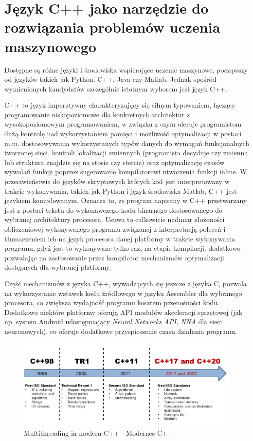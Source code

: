\section{Język C++ jako narzędzie do rozwiązania problemów uczenia maszynowego}

Dostępne są różne języki i środowiska wspierające uczenie maszynowe, począwszy od języków takich jak Python, C++, Java czy Matlab. Jednak spośród wymienionych kandydatów szczególnie istotnym wyborem jest język C++. 

C++ to język imperatywny charakteryzujący się silnym typowaniem, łączący programowanie niskopoziomowe dla konkretnych architektur z wysokopoziomowym programowaniem, w związku z czym oferuje programistom dużą kontrolę nad wykorzystaniem pamięci i możliwość optymalizacji w postaci m.in. dostosowywania wykorzystanych typów danych do wymagań funkcjonalnych tworzonej sieci, kontroli lokalizacji zmiennych (programista decyduje czy zmienna lub struktura znajdzie się na stosie czy stercie) oraz optymalizację czasów wywołań funkcji poprzez sugerowanie kompilatorowi utworzenia funkcji inline. W przeciwieństwie do języków skryptowych których kod jest interpretowany w trakcie wykonywania, takich jak Python i język środowiska Matlab, C++ jest językiem kompilowanym. Oznacza to, że program napisany w C++ przetwarzany jest z postaci tekstu do wykonawczego kodu binarnego dostosowanego do wybranej architektury procesora. Usuwa to całkowicie nadmiar złożoności obliczeniowej wykonywanego programu związanej z interpretacją poleceń i tłumaczeniem ich na język procesora danej platformy w trakcie wykonywania programu, gdyż jest to wykonywane tylko raz, na etapie kompilacji, dodatkowo pozwalając na zastosowanie przez kompilator mechanizmów optymalizacji dostępnych dla wybranej platformy. 

Część mechanizmów z języka C++, wywodzących się jeszcze z języka C, pozwala na wykorzystanie wstawek kodu źródłowego w języku Assembler dla wybranego procesora, co zwiększa wydajność programu kosztem przenośności kodu. Dodatkowo niektóre platformy oferują API modułów akceleracji sprzętowej (jak np. system Android udostępniający \textit{Neural Networks API, NNA} dla sieci neuronowych), co oferuje dodatkowe przyspieszenie czasu działania programu.

\begin{figure}[!ht]
    \centering
    \includegraphics[width=150mm]{Rysunki/Rozdzial2/multithreading.jpg}
    \caption{Multithreading in modern C++ - Modernes C++}
    \label{fig:cpp_history}
\end{figure}

